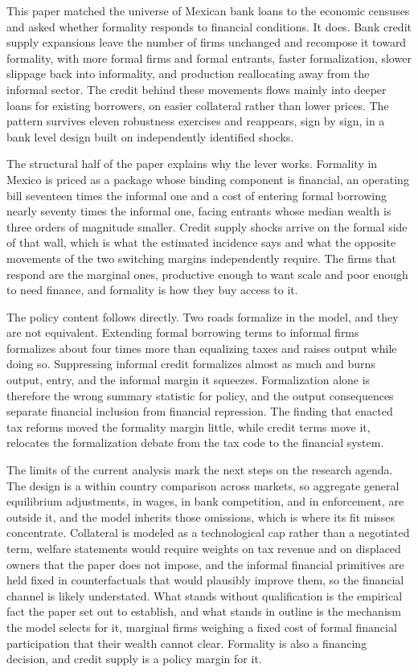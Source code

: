 \documentclass[12pt]{article}
\begin{document}
This paper matched the universe of Mexican bank loans to the economic censuses and asked whether formality responds to financial conditions. It does. Bank credit supply expansions leave the number of firms unchanged and recompose it toward formality, with more formal firms and formal entrants, faster formalization, slower slippage back into informality, and production reallocating away from the informal sector. The credit behind these movements flows mainly into deeper loans for existing borrowers, on easier collateral rather than lower prices. The pattern survives eleven robustness exercises and reappears, sign by sign, in a bank level design built on independently identified shocks.

The structural half of the paper explains why the lever works. Formality in Mexico is priced as a package whose binding component is financial, an operating bill seventeen times the informal one and a cost of entering formal borrowing nearly seventy times the informal one, facing entrants whose median wealth is three orders of magnitude smaller. Credit supply shocks arrive on the formal side of that wall, which is what the estimated incidence says and what the opposite movements of the two switching margins independently require. The firms that respond are the marginal ones, productive enough to want scale and poor enough to need finance, and formality is how they buy access to it.

The policy content follows directly. Two roads formalize in the model, and they are not equivalent. Extending formal borrowing terms to informal firms formalizes about four times more than equalizing taxes and raises output while doing so. Suppressing informal credit formalizes almost as much and burns output, entry, and the informal margin it squeezes. Formalization alone is therefore the wrong summary statistic for policy, and the output consequences separate financial inclusion from financial repression. The finding that enacted tax reforms moved the formality margin little, while credit terms move it, relocates the formalization debate from the tax code to the financial system.

The limits of the current analysis mark the next steps on the research agenda. The design is a within country comparison across markets, so aggregate general equilibrium adjustments, in wages, in bank competition, and in enforcement, are outside it, and the model inherits those omissions, which is where its fit misses concentrate. Collateral is modeled as a technological cap rather than a negotiated term, welfare statements would require weights on tax revenue and on displaced owners that the paper does not impose, and the informal financial primitives are held fixed in counterfactuals that would plausibly improve them, so the financial channel is likely understated. What stands without qualification is the empirical fact the paper set out to establish, and what stands in outline is the mechanism the model selects for it, marginal firms weighing a fixed cost of formal financial participation that their wealth cannot clear. Formality is also a financing decision, and credit supply is a policy margin for it.
\end{document}

